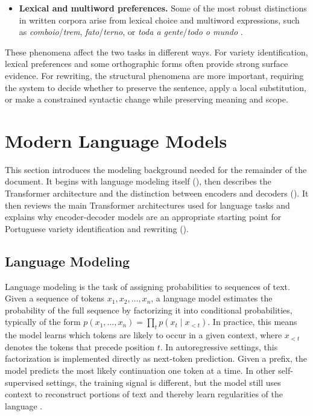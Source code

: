 \begin{itemize}
\item \textbf{Lexical and multiword preferences.} Some of the most robust
distinctions in written corpora arise from lexical choice and multiword
expressions, such as \textit{comboio}/\textit{trem},
\textit{fato}/\textit{terno}, or \textit{toda a gente}/\textit{todo o mundo}
\citep{barreiro-mota-2018-paraphrastic, costa-jussa-etal-2018-neural}.
\end{itemize}

These phenomena affect the two tasks in different ways. For variety
identification, lexical preferences and some orthographic forms often provide
strong surface evidence. For rewriting, the structural phenomena are more
important, requiring the system to decide whether to preserve the sentence, apply
a local substitution, or make a constrained syntactic change while preserving
meaning and scope.

\section{Modern Language Models}
\label{sec:modern-language-models}

This section introduces the modeling background needed for the remainder of the
document. It begins with language modeling itself
(), then describes the Transformer architecture and
the distinction between encoders and decoders ().
It then reviews the main Transformer architectures used for language tasks and
explains why encoder-decoder models are an appropriate starting point for
Portuguese variety identification and rewriting
().

\subsection{Language Modeling}
\label{sec:language-models}

Language modeling is the task of assigning probabilities to sequences of text.
Given a sequence of tokens $x_1, x_2, \ldots, x_n$, a language model estimates
the probability of the full sequence by factorizing it into conditional
probabilities, typically of the form
$p(x_1, \ldots, x_n) = \prod_t p(x_t \mid x_{<t})$. In practice, this means
the model learns which tokens are likely to occur in a given context, where
$x_{<t}$ denotes the tokens that precede position $t$. In autoregressive
settings, this factorization is implemented directly as next-token prediction.
Given a prefix, the model predicts the most likely continuation one token at a
time. In other self-supervised settings, the training signal is different, but
the model still uses context to reconstruct portions of text and thereby learn
regularities of the language \citep{zhao2025surveylargelanguagemodels}.

